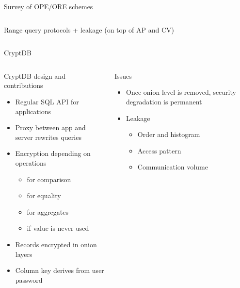\begin{frame}{Survey of OPE/ORE schemes~\cite{ore-benchmark-17}}
\begin{columns}[T,onlytextwidth]
\begin{block}{Range query protocols + leakage (on top of AP and CV)}
					\end{block}

			\end{columns}

		\end{frame}

		\begin{frame}{CryptDB~\cite{crypt-db}}

			\begin{columns}[T,onlytextwidth]

					\begin{block}{CryptDB design and contributions}

						\begin{itemize}
							\item Regular SQL API for applications
							\item Proxy between app and server rewrites queries
							\item Encryption depending on operations
							\begin{small}
								\begin{itemize}
									\item {} for comparison
									\item {} for equality
									\item {} for aggregates
									\item {} if value is never used
								\end{itemize}
							\end{small}
							\item Records encrypted in onion layers
							\item Column key derives from user password
						\end{itemize}

					\end{block}


					\begin{block}{Issues}

						\begin{itemize}
							\item Once onion level is removed, security degradation is permanent
							\item Leakage
							\begin{itemize}
								\item Order and histogram
								\item Access pattern
								\item Communication volume
							\end{itemize}
						\end{itemize}

					\end{block}

			\end{columns}

		\end{frame}

